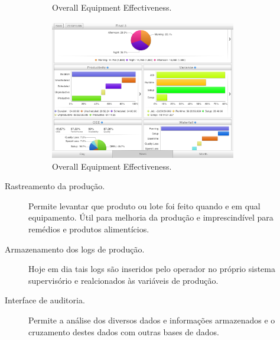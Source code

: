 \begin{description}
\begin{figure}[hbt]
\begin{center}
	\end{center}
	\caption{Overall Equipment Effectiveness.}
	\label{fig:oeeEq}
\end{figure}
\begin{figure}[hbt]
	\begin{center}
		\includegraphics[width=0.8\textwidth]{figuras/oee2}
	\end{center}
	\caption{Overall Equipment Effectiveness.}
	\label{fig:oee}
\end{figure}

	\item[Rastreamento da produção.] Permite levantar que produto ou lote foi feito quando e em qual equipamento. Útil para melhoria da produção e imprescindível para remédios e produtos alimentícios.
	\item[Armazenamento dos logs de produção.] Hoje em dia tais logs são inseridos pelo operador no próprio sistema supervisório e realcionados às variáveis de produção.
	\item[Interface de auditoria.] Permite a análise dos diversos dados e informações armazenados e o cruzamento destes dados com outras bases de dados.
\end{description}



